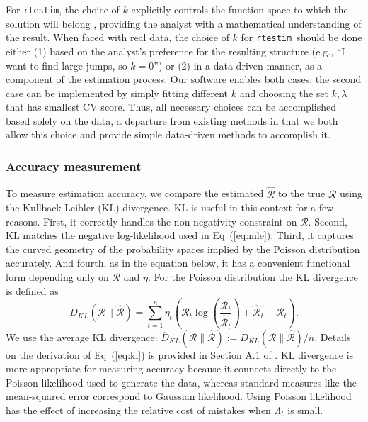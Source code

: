 \documentclass[10pt,letterpaper]{article}
\newcommand{\lr}[1]{\left(#1\right)}
\def\RtEstim{\texttt{rtestim}}
\def\calR{\mathcal{R}}
\renewcommand{\eqref}[1]{Eq~(\ref{#1})}
\begin{document}
For \RtEstim, the choice of $k$ explicitly controls the function space to which
the solution will belong \cite{tibshirani2022divided}, providing the analyst
with a mathematical understanding of the result. When faced with real data, the
choice of $k$ for \RtEstim\ should be done either (1) based on the analyst's
preference for the resulting structure (e.g., ``I want to find large jumps, so
$k=0$'') or (2) in a data-driven manner, as a component of the estimation
process.  Our software enables both cases: the second case can be implemented by
simply fitting different $k$ and choosing the set $k,\lambda$ that has smallest
CV score. Thus, all necessary choices can be accomplished based solely on the
data, a departure from existing methods in that we both allow this choice and
provide simple data-driven methods to accomplish it.

\subsubsection{Accuracy measurement}

To measure estimation accuracy, we compare the estimated $\widehat{\calR}$ to
the true $\calR$ using the Kullback-Leibler (KL) divergence. KL is useful in
this context for a few reasons. First, it correctly handles the non-negativity
constraint on $\calR$. Second, KL matches the negative log-likelihood used in
\eqref{eq:mle}. Third, it captures the curved geometry of the probability spaces
implied by the Poisson distribution accurately. And fourth, as in the equation
below, it has a convenient functional form depending only on $\calR$ and $\eta$.
For the Poisson distribution the KL divergence is defined as
\begin{equation} \label{eq:kl}
  D_{KL}(\calR \parallel \widehat{\calR}) = \sum_{t=1}^n \eta_t \lr{\calR_t
  \log\left(\frac{\calR_t} {\widehat{\calR}_t}\right) + \widehat{\calR}_t -
{\calR}_t}.
\end{equation}
We use the average KL divergence: $\overline{D}_{KL}(\calR \parallel
\widehat{\calR}) := D_{KL}(\calR \parallel \widehat{\calR}) / n$. Details on the
derivation of \eqref{eq:kl} is provided in Section A.1 of . KL
divergence is more appropriate for measuring accuracy because it connects
directly to the Poisson likelihood used to generate the data, whereas standard
measures like the mean-squared error correspond to Gaussian likelihood. Using
Poisson likelihood has the effect of increasing the relative cost of mistakes
when $\Lambda_t$ is small. 
\end{document}
